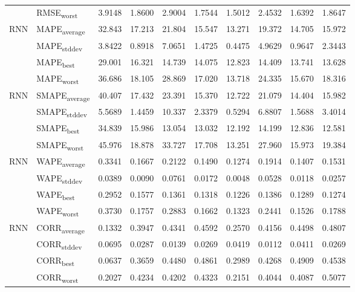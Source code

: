 {\begin{longtable}{l l c c c c c c c c}
 & RMSE\textsubscript{worst} & 3.9148 & 1.8600 & 2.9004 & 1.7544 & 1.5012 & 2.4532 & 1.6392 & 1.8647 \\
\cmidrule(lr){2-10}
\multirow{4}{*}{RNN} & MAPE\textsubscript{average} & 32.843 & 17.213 & 21.804 & 15.547 & 13.271 & 19.372 & 14.705 & 15.972 \\
 & MAPE\textsubscript{stddev} & 3.8422 & 0.8918 & 7.0651 & 1.4725 & 0.4475 & 4.9629 & 0.9647 & 2.3443 \\
 & MAPE\textsubscript{best} & 29.001 & 16.321 & 14.739 & 14.075 & 12.823 & 14.409 & 13.741 & 13.628 \\
 & MAPE\textsubscript{worst} & 36.686 & 18.105 & 28.869 & 17.020 & 13.718 & 24.335 & 15.670 & 18.316 \\
\cmidrule(lr){2-10}
\multirow{4}{*}{RNN} & SMAPE\textsubscript{average} & 40.407 & 17.432 & 23.391 & 15.370 & 12.722 & 21.079 & 14.404 & 15.982 \\
 & SMAPE\textsubscript{stddev} & 5.5689 & 1.4459 & 10.337 & 2.3379 & 0.5294 & 6.8807 & 1.5688 & 3.4014 \\
 & SMAPE\textsubscript{best} & 34.839 & 15.986 & 13.054 & 13.032 & 12.192 & 14.199 & 12.836 & 12.581 \\
 & SMAPE\textsubscript{worst} & 45.976 & 18.878 & 33.727 & 17.708 & 13.251 & 27.960 & 15.973 & 19.384 \\
\cmidrule(lr){2-10}
\multirow{4}{*}{RNN} & WAPE\textsubscript{average} & 0.3341 & 0.1667 & 0.2122 & 0.1490 & 0.1274 & 0.1914 & 0.1407 & 0.1531 \\
 & WAPE\textsubscript{stddev} & 0.0389 & 0.0090 & 0.0761 & 0.0172 & 0.0048 & 0.0528 & 0.0118 & 0.0257 \\
 & WAPE\textsubscript{best} & 0.2952 & 0.1577 & 0.1361 & 0.1318 & 0.1226 & 0.1386 & 0.1289 & 0.1274 \\
 & WAPE\textsubscript{worst} & 0.3730 & 0.1757 & 0.2883 & 0.1662 & 0.1323 & 0.2441 & 0.1526 & 0.1788 \\
\cmidrule(lr){2-10}
\multirow{4}{*}{RNN} & CORR\textsubscript{average} & 0.1332 & 0.3947 & 0.4341 & 0.4592 & 0.2570 & 0.4156 & 0.4498 & 0.4807 \\
 & CORR\textsubscript{stddev} & 0.0695 & 0.0287 & 0.0139 & 0.0269 & 0.0419 & 0.0112 & 0.0411 & 0.0269 \\
 & CORR\textsubscript{best} & 0.0637 & 0.3659 & 0.4480 & 0.4861 & 0.2989 & 0.4268 & 0.4909 & 0.4538 \\
 & CORR\textsubscript{worst} & 0.2027 & 0.4234 & 0.4202 & 0.4323 & 0.2151 & 0.4044 & 0.4087 & 0.5077 \\

\end{longtable}}
